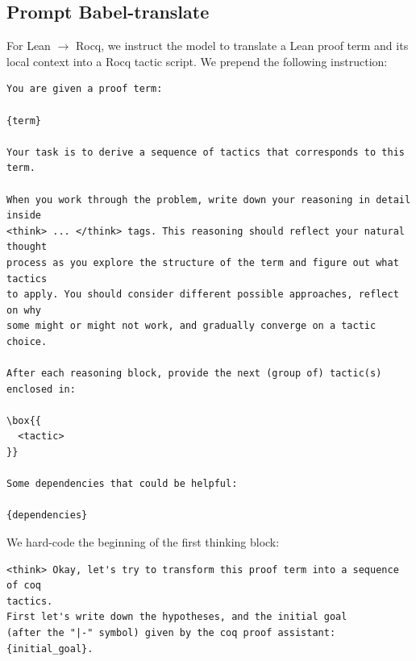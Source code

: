 \documentclass{article}
\begin{document}
\subsection{Prompt Babel-translate}
\label{app:promptbabel}
For Lean $\to$ Rocq, we instruct the model to translate a Lean proof term and its local context into a Rocq tactic script. We prepend the following instruction:
\begin{verbatim}
You are given a proof term:

{term}

Your task is to derive a sequence of tactics that corresponds to this term.

When you work through the problem, write down your reasoning in detail inside
<think> ... </think> tags. This reasoning should reflect your natural thought
process as you explore the structure of the term and figure out what tactics
to apply. You should consider different possible approaches, reflect on why 
some might or might not work, and gradually converge on a tactic choice.

After each reasoning block, provide the next (group of) tactic(s) enclosed in:

\box{{
  <tactic>
}}

Some dependencies that could be helpful:

{dependencies}
\end{verbatim}
We hard-code the beginning of the first thinking block:
\begin{verbatim}
<think> Okay, let's try to transform this proof term into a sequence of coq
tactics.
First let's write down the hypotheses, and the initial goal
(after the "|-" symbol) given by the coq proof assistant:
{initial_goal}.
\end{verbatim}
\end{document}
